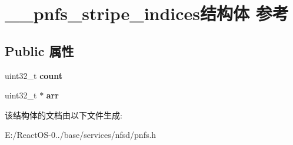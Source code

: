 \hypertarget{struct____pnfs__stripe__indices}{}\section{\+\_\+\+\_\+pnfs\+\_\+stripe\+\_\+indices结构体 参考}
\label{struct____pnfs__stripe__indices}
\subsection*{Public 属性}
\begin{DoxyCompactItemize}
\item 
\mbox{\label{struct____pnfs__stripe__indices_a79478bf0e10eff3f61de3675b603ebf6}} 
uint32\+\_\+t {\bfseries count}
\item 
\mbox{\label{struct____pnfs__stripe__indices_a884562404c3f007dfe1990fd1dc6e5e9}} 
uint32\+\_\+t $\ast$ {\bfseries arr}
\end{DoxyCompactItemize}


该结构体的文档由以下文件生成\+:\begin{DoxyCompactItemize}
\item 
E\+:/\+React\+O\+S-\/0../base/services/nfsd/pnfs.\+h\end{DoxyCompactItemize}
